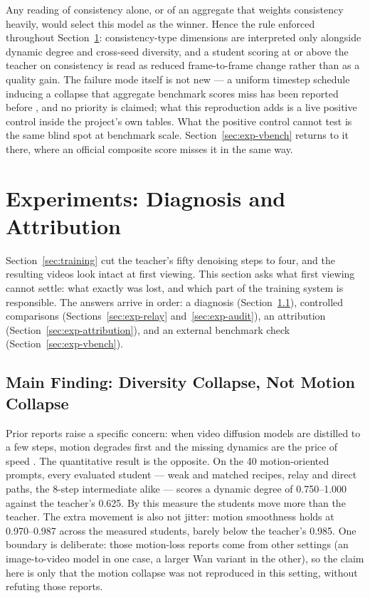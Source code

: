 \documentclass[11pt,a4paper]{article}
\begin{document}
Any reading of consistency alone, or of an aggregate that weights consistency heavily, would select this model as the winner. Hence the rule enforced throughout Section~\ref{sec:experiments}: consistency-type dimensions are interpreted only alongside dynamic degree and cross-seed diversity, and a student scoring at or above the teacher on consistency is read as reduced frame-to-frame change rather than as a quality gain. The failure mode itself is not new — a uniform timestep schedule inducing a collapse that aggregate benchmark scores miss has been reported before \cite{tmd}, and no priority is claimed; what this reproduction adds is a live positive control inside the project's own tables. What the positive control cannot test is the same blind spot at benchmark scale. Section~\ref{sec:exp-vbench} returns to it there, where an official composite score misses it in the same way.

\section{Experiments: Diagnosis and Attribution}\label{sec:experiments}

Section~\ref{sec:training} cut the teacher's fifty denoising steps to four, and the resulting videos look intact at first viewing. This section asks what first viewing cannot settle: what exactly was lost, and which part of the training system is responsible. The answers arrive in order: a diagnosis (Section~\ref{sec:exp-diversity}), controlled comparisons (Sections~\ref{sec:exp-relay} and~\ref{sec:exp-audit}), an attribution (Section~\ref{sec:exp-attribution}), and an external benchmark check (Section~\ref{sec:exp-vbench}).

\subsection{Main Finding: Diversity Collapse, Not Motion Collapse}\label{sec:exp-diversity}

Prior reports raise a specific concern: when video diffusion models are distilled to a few steps, motion degrades first and the missing dynamics are the price of speed \cite{dataforcing,phaseddmd}. The quantitative result is the opposite. On the 40 motion-oriented prompts, every evaluated student — weak and matched recipes, relay and direct paths, the 8-step intermediate alike — scores a dynamic degree of 0.750–1.000 against the teacher's 0.625. By this measure the students move more than the teacher. The extra movement is also not jitter: motion smoothness holds at 0.970–0.987 across the measured students, barely below the teacher's 0.985. One boundary is deliberate: those motion-loss reports come from other settings (an image-to-video model in one case, a larger Wan variant in the other), so the claim here is only that the motion collapse was not reproduced in this setting, without refuting those reports.
\end{document}
